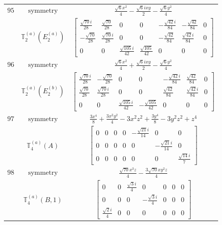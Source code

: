 \documentclass[fleqn,8pt,landscape]{jsarticle}
\begin{document}
\begin{longtable}{ccc}
$ 95 $ & $ \text{symmetry} $ & $ \frac{\sqrt{6} x^{2}}{4} - \frac{\sqrt{6} i x y}{2} - \frac{\sqrt{6} y^{2}}{4} $ \\
$  $ & $ \mathbb{T}_{2}^{(a)}(E_{2}^{(a)}) $ & $ \begin{bmatrix} \frac{\sqrt{70} i}{28} & \frac{\sqrt{70}}{28} & 0 & 0 & - \frac{\sqrt{42} i}{84} & - \frac{\sqrt{42}}{84} & 0 \\ - \frac{\sqrt{70}}{28} & \frac{\sqrt{70} i}{28} & 0 & 0 & - \frac{\sqrt{42}}{84} & \frac{\sqrt{42} i}{84} & 0 \\ 0 & 0 & \frac{\sqrt{105} i}{42} & \frac{\sqrt{105}}{42} & 0 & 0 & 0 \end{bmatrix} $ \\ \hline
$ 96 $ & $ \text{symmetry} $ & $ \frac{\sqrt{6} x^{2}}{4} + \frac{\sqrt{6} i x y}{2} - \frac{\sqrt{6} y^{2}}{4} $ \\
$  $ & $ \mathbb{T}_{2}^{(a)}(E_{2}^{(b)}) $ & $ \begin{bmatrix} \frac{\sqrt{70} i}{28} & - \frac{\sqrt{70}}{28} & 0 & 0 & - \frac{\sqrt{42} i}{84} & \frac{\sqrt{42}}{84} & 0 \\ \frac{\sqrt{70}}{28} & \frac{\sqrt{70} i}{28} & 0 & 0 & \frac{\sqrt{42}}{84} & \frac{\sqrt{42} i}{84} & 0 \\ 0 & 0 & \frac{\sqrt{105} i}{42} & - \frac{\sqrt{105}}{42} & 0 & 0 & 0 \end{bmatrix} $ \\ \hline
$ 97 $ & $ \text{symmetry} $ & $ \frac{3 x^{4}}{8} + \frac{3 x^{2} y^{2}}{4} - 3 x^{2} z^{2} + \frac{3 y^{4}}{8} - 3 y^{2} z^{2} + z^{4} $ \\
$  $ & $ \mathbb{T}_{4}^{(a)}(A) $ & $ \begin{bmatrix} 0 & 0 & 0 & 0 & - \frac{\sqrt{21} i}{14} & 0 & 0 \\ 0 & 0 & 0 & 0 & 0 & - \frac{\sqrt{21} i}{14} & 0 \\ 0 & 0 & 0 & 0 & 0 & 0 & \frac{\sqrt{14} i}{7} \end{bmatrix} $ \\ \hline
$ 98 $ & $ \text{symmetry} $ & $ \frac{\sqrt{70} x^{3} z}{4} - \frac{3 \sqrt{70} x y^{2} z}{4} $ \\
$  $ & $ \mathbb{T}_{4}^{(a)}(B,1) $ & $ \begin{bmatrix} 0 & 0 & \frac{\sqrt{3} i}{4} & 0 & 0 & 0 & 0 \\ 0 & 0 & 0 & - \frac{\sqrt{3} i}{4} & 0 & 0 & 0 \\ \frac{\sqrt{2} i}{4} & 0 & 0 & 0 & 0 & 0 & 0 \end{bmatrix} $ \\ \hline

\end{longtable}
\end{document}
